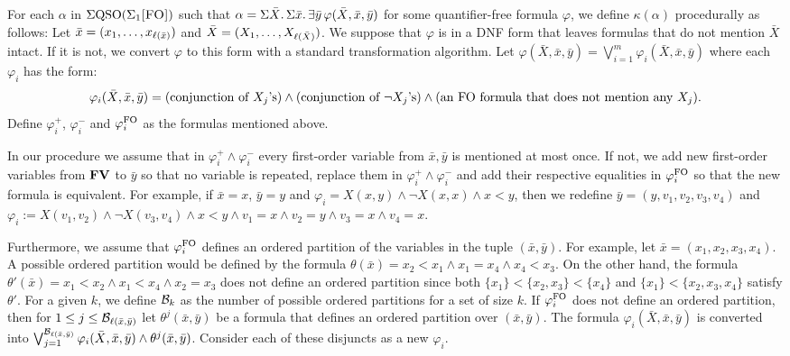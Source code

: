 \vspace{1em}

For each $\alpha$ in $\Sigma{\rm QSO}(\Sigma_{1}\textsc{[FO]})$ such that $\alpha = \Sigma{\bar{X}}.\,\Sigma{\bar{x}}.\,\exists\bar{y}\,\varphi(\bar{X},\bar{x},\bar{y})$ for some quantifier-free formula $\varphi$, we define $\kappa(\alpha)$ procedurally as follows: Let $\bar{x} = (x_1,\ldots,x_{\ell(\bar{x})})$ and $\bar{X} = (X_1,\ldots,X_{\ell(\bar{X})})$. We suppose that $\varphi$ is in a DNF form that leaves formulas that do not mention $\bar{X}$ intact. If it is not, we convert $\varphi$ to this form with a standard transformation algorithm. Let $\varphi(\bar{X},\bar{x},\bar{y}) = \bigvee_{i = 1}^m\varphi_i(\bar{X},\bar{x},\bar{y})$ where each $\varphi_i$ has the form:
$$
\varphi_i(\bar{X},\bar{x},\bar{y}) = (\text{conjunction of $X_j$'s}) \wedge (\text{conjunction of $\neg X_j$'s})  \wedge (\text{an ${\rm FO}$ formula that does not mention any $X_j$}).
$$
Define $\varphi_i^{+}$, $\varphi_i^{-}$ and $\varphi_i^{{\rm FO}}$ as the formulas mentioned above. 

In our procedure we assume that in $\varphi_i^{+}\wedge\varphi_i^{-}$ every first-order variable from $\bar{x},\bar{y}$ is mentioned at most once. If not, we add new first-order variables from $\mathbf{FV}$ to $\bar{y}$ so that no variable is repeated, replace them in $\varphi_i^{+}\wedge\varphi_i^{-}$ and add their respective equalities in $\varphi_i^{{\rm FO}}$ so that the new formula is equivalent. For example, if $\bar{x} = x$, $\bar{y} = y$ and $\varphi_i = X(x,y)\wedge \neg X(x,x) \wedge x < y$, then we redefine $\bar{y} = (y,v_1,v_2,v_3,v_4)$ and $\varphi_i := X(v_1,v_2) \wedge \neg X(v_3,v_4) \wedge x < y \wedge v_1 = x \wedge v_2 = y \wedge v_3 = x \wedge v_4 = x.$ 

Furthermore, we assume that $\varphi_i^{{\rm FO}}$ defines an ordered partition of the variables in the tuple $(\bar{x},\bar{y})$. For example, let $\bar{x} = (x_1,x_2,x_3,x_4)$. A possible ordered partition would be defined by the formula $\theta(\bar{x}) = x_2 < x_1 \wedge x_1 = x_4 \wedge x_4 < x_3$. On the other hand, the formula $\theta'(\bar{x}) = x_1 < x_2 \wedge x_1 < x_4 \wedge x_2 = x_3$ does not define an ordered partition since both $\{x_1\}<\{x_2,x_3\}<\{x_4\}$ and $\{x_1\} < \{x_2,x_3,x_4\}$ satisfy $\theta'$.
For a given $k$, we define $\mathcal{B}_k$ as the number of possible ordered partitions for a set of size $k$. 
If $\varphi_i^{{\rm FO}}$ does not define an ordered partition, then for $1 \leq j \leq \mathcal{B}_{\ell(\bar{x},\bar{y})}$ 
let $\theta^j(\bar{x},\bar{y})$ be a formula that defines an ordered partition over $(\bar{x},\bar{y})$. The formula $\varphi_i(\bar{X},\bar{x},\bar{y})$ is converted into $\bigvee_{j = 1}^{\mathcal{B}_{\ell(\bar{x},\bar{y})}}\varphi_i(\bar{X},\bar{x},\bar{y}) \wedge \theta^j(\bar{x},\bar{y})$. Consider each of these disjuncts as a new $\varphi_i$.

